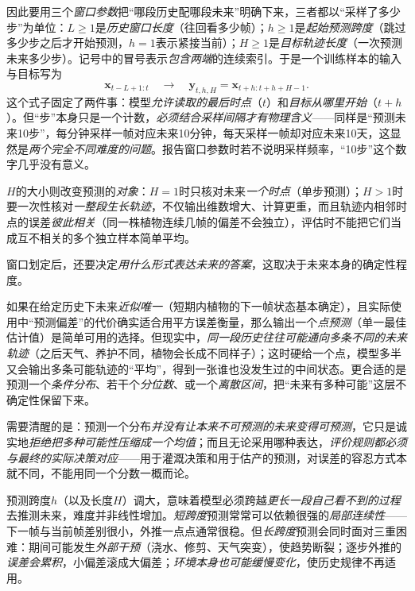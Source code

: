 因此要用三个\emph{窗口参数}把“哪段历史配哪段未来”明确下来，三者都以“采样了多少步”为单位：$L\geq1$是\emph{历史窗口长度}（往回看多少帧）；$h\geq1$是\emph{起始预测跨度}（跳过多少步之后才开始预测，$h=1$表示紧接当前）；$H\geq1$是\emph{目标轨迹长度}（一次预测未来多少步）。记号中的冒号表示\emph{包含两端}的连续索引。于是一个训练样本的输入与目标写为
\begin{equation}
  \bm{x}_{t-L+1:t}
  \quad\longrightarrow\quad
  \bm{y}_{t,h,H}
  =\bm{x}_{t+h:t+h+H-1}.
  \label{eq:data-derived-knowledge-temporal-windows}
\end{equation}
这个式子固定了两件事：模型\emph{允许读取的最后时点}（$t$）和\emph{目标从哪里开始}（$t+h$）。但“步”本身只是一个计数，\emph{必须结合采样间隔才有物理含义}——同样是“预测未来10步”，每分钟采样一帧对应未来10分钟，每天采样一帧却对应未来10天，这显然是\emph{两个完全不同难度的问题}。报告窗口参数时若不说明采样频率，“10步”这个数字几乎没有意义。

$H$的大小则改变预测的\emph{对象}：$H=1$时只核对未来\emph{一个时点}（单步预测）；$H>1$时要一次性核对\emph{一整段生长轨迹}，不仅输出维数增大、计算更重，而且轨迹内相邻时点的误差\emph{彼此相关}（同一株植物连续几帧的偏差不会独立），评估时不能把它们当成互不相关的多个独立样本简单平均。

窗口划定后，还要决定\emph{用什么形式表达未来的答案}，这取决于未来本身的确定性程度。

如果在给定历史下未来\emph{近似唯一}（短期内植物的下一帧状态基本确定），且实际使用中“预测偏差”的代价确实适合用平方误差衡量，那么输出一个\emph{点预测}（单一最佳估计值）是简单可用的选择。但现实中，\emph{同一段历史往往可能通向多条不同的未来轨迹}（之后天气、养护不同，植物会长成不同样子）；这时硬给一个点，模型多半又会输出多条可能轨迹的“平均”，得到一张谁也没发生过的中间状态。更合适的是预测一个\emph{条件分布}、若干个\emph{分位数}、或一个\emph{离散区间}，把“未来有多种可能”这层不确定性保留下来。

需要清醒的是：预测一个分布\emph{并没有让本来不可预测的未来变得可预测}，它只是诚实地\emph{拒绝把多种可能性压缩成一个均值}；而且无论采用哪种表达，\emph{评价规则都必须与最终的实际决策对应}——用于灌溉决策和用于估产的预测，对误差的容忍方式本就不同，不能用同一个分数一概而论。

预测跨度$h$（以及长度$H$）调大，意味着模型必须跨越\emph{更长一段自己看不到的过程}去推测未来，难度并非线性增加。\emph{短跨度}预测常常可以依赖很强的\emph{局部连续性}——下一帧与当前帧差别很小，外推一点点通常很稳。但\emph{长跨度}预测会同时面对三重困难：期间可能发生\emph{外部干预}（浇水、修剪、天气突变），使趋势断裂；逐步外推的\emph{误差会累积}，小偏差滚成大偏差；\emph{环境本身也可能缓慢变化}，使历史规律不再适用。

